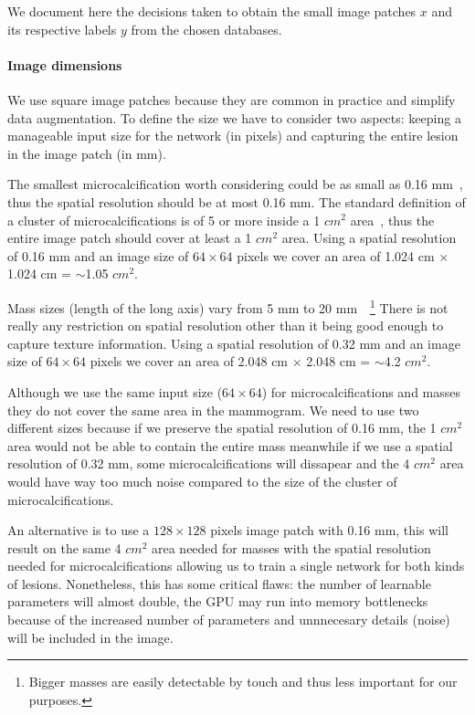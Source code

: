 We document here the decisions taken to obtain the small image patches $x$ and its respective labels $y$ from the chosen databases.

\paragraph{Image dimensions}
We use square image patches because they are common in practice and simplify data augmentation. To define the size we have to consider two aspects: keeping a manageable input size for the network (in pixels) and capturing the entire lesion in the image patch (in mm).

The smallest microcalcification worth considering could be as small as 0.16 mm~\cite{Lo1998}, thus the spatial resolution should be at most 0.16 mm. The standard definition of a cluster of microcalcifications is of 5 or more inside a 1 $cm^2$ area~\cite{Sickles2013}, thus the entire image patch should cover at least a 1 $cm^2$ area. Using a spatial resolution of 0.16 mm and an image size of $64 \times 64$ pixels we cover an area of 1.024 cm $\times$ 1.024 cm = $\sim$1.05 $cm^2$.

Mass sizes (length of the long axis) vary from 5 mm to 20 mm~\cite{Sahiner1996}~\footnote{Bigger masses are easily detectable by touch and thus less important for our purposes.} There is not really any restriction on spatial resolution other than it being good enough to capture texture information. Using a spatial resolution of 0.32 mm and an image size of $64 \times 64$ pixels we cover an area of 2.048 cm $\times$ 2.048 cm = $\sim$4.2 $cm^2$.

Although we use the same input size ($64 \times 64$) for microcalcifications and masses they do not cover the same area in the mammogram. We need to use two different sizes because if we preserve the spatial resolution of 0.16 mm, the 1 $cm^2$ area would not be able to contain the entire mass meanwhile if we use a spatial resolution of 0.32 mm, some microcalcifications will dissapear and the 4 $cm^2$ area would have way too much noise compared to the size of the cluster of microcalcifications.

An alternative is to use a $128 \times 128$ pixels image patch with 0.16 mm, this will result on the same 4 $cm^2$ area needed for masses with the spatial resolution needed for microcalcifications allowing us to train a single network for both kinds of lesions. Nonetheless, this has some critical flaws: the number of learnable parameters will almost double, the GPU may run into memory bottlenecks because of the increased number of parameters and unnnecesary details (noise) will be included in the image.


